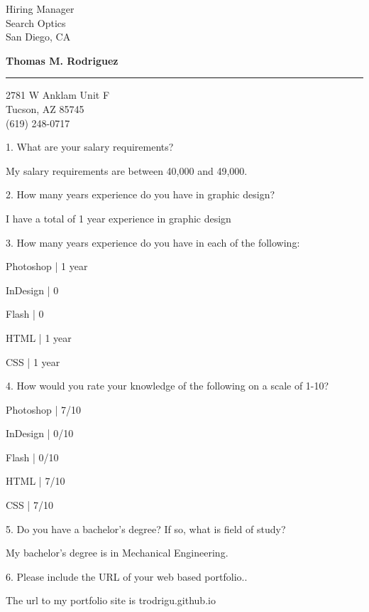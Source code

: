 \documentclass{letter} %
\begin{document}
\signature{Thomas M. Rodriguez}           %
\longindentation=0pt                       %
\let\raggedleft\raggedright                %
 
 
\begin{letter}{Hiring Manager \\
Search Optics \\
San Diego, CA}

\begin{center}
{\large\bf Thomas M. Rodriguez}
\end{center}
\medskip\hrule height 1pt
\begin{center}
{2781 W Anklam Unit F \\ Tucson, AZ 85745 \\ (619) 248-0717}
\end{center} \vfill %
 
 
 
1. What are your salary requirements?

My salary requirements are between 40,000 and 49,000.

2. How many years experience do you have in graphic design?

I have a total of 1 year experience in graphic design

3. How many years experience do you have in each of the following:

Photoshop | 1 year

InDesign | 0  

Flash | 0  

HTML | 1 year  

CSS | 1 year  

4. How would you rate your knowledge of the following on a scale of 1-10?

Photoshop | 7/10

InDesign | 0/10

Flash | 0/10

HTML | 7/10

CSS | 7/10

5. Do you have a bachelor's degree? If so, what is field of study?

My bachelor's degree is in Mechanical Engineering.  

6. Please include the URL of your web based portfolio..

The url to my portfolio site is trodrigu.github.io
 
 

 

\end{letter}
 
\end{document}
